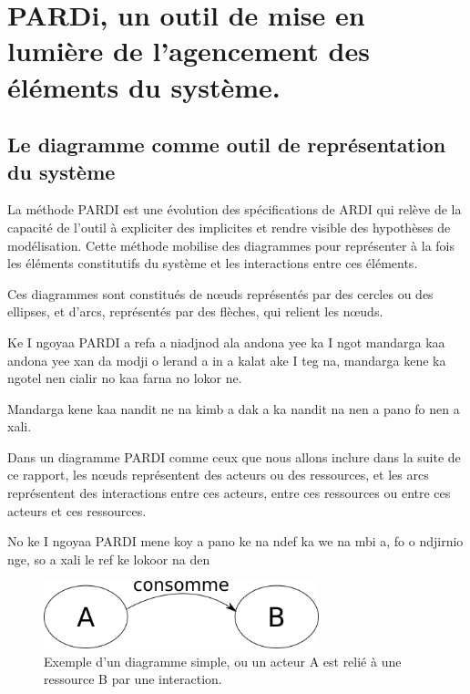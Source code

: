 \section{PARDi, un outil de mise en lumière de l'agencement des éléments du système.}

\subsection{Le diagramme comme outil de représentation du système}

\begin{paracol}{2}
  La méthode PARDI est une évolution des spécifications de ARDI\cite{etienne_ardi_2011} qui relève de la capacité de l'outil à expliciter des implicites et rendre visible des hypothèses de modélisation. Cette méthode mobilise des diagrammes pour représenter à la fois les éléments constitutifs du système et les interactions entre ces éléments.

  Ces diagrammes sont constitués de nœuds représentés par des cercles ou des ellipses, et d'arcs, représentés par des flèches, qui relient les nœuds.

  \switchcolumn %

  Ke I ngoyaa PARDI a refa a niadjnod ala andona yee ka I ngot mandarga kaa andona yee xan da modji o lerand a in a kalat ake I teg na, mandarga kene ka ngotel nen cialir no kaa farna no lokor ne.

  Mandarga kene kaa nandit ne na kimb a dak a ka nandit na nen a pano fo nen a xali.

  \switchcolumn %

  Dans un diagramme PARDI comme ceux que nous allons inclure dans la suite de ce rapport, les nœuds représentent des acteurs ou des ressources, et les arcs représentent des interactions entre ces acteurs, entre ces ressources ou entre ces acteurs et ces ressources.

  \switchcolumn %

  No ke I ngoyaa PARDI mene koy a pano ke na ndef ka we na mbi a, fo o ndjirnio nge, so a xali le ref ke lokoor na den

\end{paracol}

\begin{figure}[h!]
  \begin{center}
    \includegraphics[width=8cm]{img/diagramme_simple.png}
  \end{center}
  \caption{Exemple d'un diagramme simple, ou un acteur A est relié à une ressource B par une interaction.}
  \label{simple_interac}
\end{figure}

